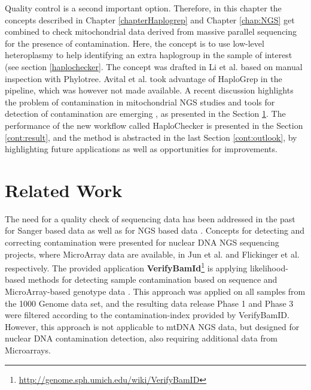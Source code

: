 Quality control is a second important option. Therefore, in this chapter the concepts described in Chapter \ref{chapterHaplogrep} and Chapter \ref{chap:NGS} get combined to check mitochondrial data derived from massive parallel sequencing for the presence of contamination. Here, the concept is to use low-level heteroplasmy to help identifying an extra haplogroup in the sample of interest (see section \ref{haplochecker}. The concept was drafted in Li et al. \cite{Li2010} based on manual inspection with Phylotree. Avital et al. \cite{Avital2012} took advantage of HaploGrep in the pipeline, which was however not made available. A recent discussion highlights the problem of contamination in mitochondrial NGS studies \cite{Ye2014,Just2014, Just2015,Ye2014reply} and tools for detection of contamination are emerging \cite{Renaud2015,Jun2012,Dickins2014}, as presented in the Section \ref{cont:relatedwork}. The performance of the new workflow called HaploChecker is presented in the Section \ref{cont:result}, and the method is abstracted in the last Section \ref{cont:outlook}, by highlighting future applications as well as opportunities for improvements.

\section{Related Work}\label{cont:relatedwork}
The need for a quality check of sequencing data has been addressed in the past for Sanger based data \cite{Walker2004, Montesino2007, Bandelt2009, Yao2007} as well as for NGS based data \cite{Holland2011}. 
Concepts for detecting and correcting contamination were presented for nuclear DNA NGS sequencing projects, where MicroArray data are available, in Jun et al. \cite{Jun2012} and Flickinger et al. \cite{Flickinger2015} respectively. The provided application \textbf{VerifyBamId}\footnote{\url{http://genome.sph.umich.edu/wiki/VerifyBamID}} is applying likelihood-based methods for detecting sample contamination based on sequence and MicroArray-based genotype data \cite{Jun2012}. This approach was applied on all samples from the 1000 Genome data set, and the resulting data release Phase 1 and Phase 3 were filtered according to the contamination-index provided by VerifyBamID. However, this approach is not applicable to mtDNA NGS data, but designed for nuclear DNA contamination detection, also requiring additional data from Microarrays.

